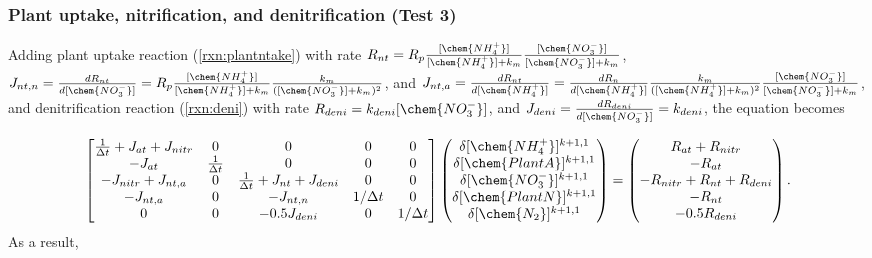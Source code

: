 \documentclass[gmd, manuscript]{copernicus}
\begin{document}
\subsubsection{Plant uptake, nitrification, and denitrification (Test 3)}
Adding plant  uptake reaction (\ref{rxn:plantntake}) with rate
$R_{nt}=R_p\frac{[\chem{NH_4^+}]}{[\chem{NH_4^+}] +
k_m}\frac{[\chem{NO_3^-}]}{[\chem{NO_3^-}] + k_m}$, $J_{nt,n}
=\frac{dR_{nt}}{d[\chem{NO_3^-}]}=R_p\frac{[\chem{NH_4^+}]}{[\chem{NH_4^+}] +
k_m}\frac{k_m}{([\chem{NO_3^-}] + k_m)^2}$, and $J_{nt,a} =
\frac{dR_{nt}}{d[\chem{NH_4^+}]}=\frac{dR_n}{d[\chem{NH_4^+}]}
\frac{k_m}{([\chem{NH_4^+}] + k_m)^2}\frac{[\chem{NO_3^-}]}{[\chem{NO_3^-}] +
k_m}$, and denitrification reaction
(\ref{rxn:deni}) with rate $R_{deni}=k_{deni} [\chem{NO_3^-}]$, and $J_{deni} =
\frac{dR_{deni}}{d[\chem{NO_3^-}]}=k_{deni}$, the equation becomes 

\begin{equation}
\label{eq:complexjacobian}
\left[
\begin{matrix}
\frac{1}{\Delta t} + J_{at} + J_{nitr} & 0                  & 0                                   &0 & 0\\
-J_{at}                              & \frac{1}{\Delta t} & 0 &0 &0\\
-J_{nitr} + J_{nt,a}                 & 0                  & \frac{1}{\Delta t} + J_{nt} + J_{deni}&0 &0 \\
-J_{nt,a}                            & 0                  & -J_{nt,n}                             &1/\Delta t & 0 \\
 0                                   & 0                  & -0.5J_{deni}                             & 0 &1/\Delta t
\end{matrix}
\right]
\left(
\begin{matrix}
\delta [\chem{NH_4^+}]^{k+1,1} \\
\delta [\chem{PlantA}]^{k+1,1} \\
\delta [\chem{NO_3^-}]^{k+1,1} \\ 
\delta [\chem{PlantN}]^{k+1,1} \\
\delta [\chem{N_2}]^{k+1,1} 
\end{matrix}
\right)
=
\left(
\begin{matrix}
R_{at} + R_{nitr} \\
-R_{at} \\
-R_{nitr} + R_{nt} + R_{deni} \\
-R_{nt} \\
-0.5R_{deni}
\end{matrix}
\right).
\end{equation}
As a result, 
\end{document}
